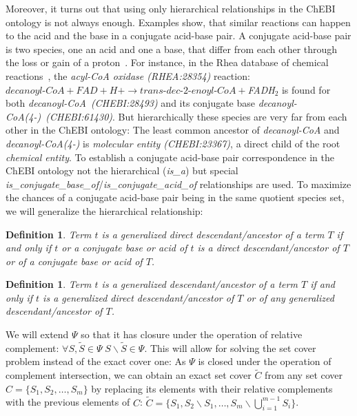 \documentclass[9pt]{article}
\newcounter{def}
\newcounter{rm}
\begin{document}
Moreover, it turns out that using only hierarchical relationships in the ChEBI ontology is not always enough. Examples show, that similar reactions can happen to the acid and the base in a conjugate acid-base pair. A conjugate acid-base pair is two species, one an acid and one a base, that differ from each other through the loss or gain of a proton~\citep{stoker2012general}. For instance, in the Rhea database of chemical reactions~\citep{Alcantara2012}, the \textit{acyl-CoA oxidase (RHEA:28354)} reaction: $\textit{decanoyl-CoA} + \textit{FAD} + \textit{H+} \rightarrow \textit{trans-dec-2-enoyl-CoA} + $\textit{FADH$_2$} is found for both \textit{decanoyl-CoA~(CHEBI:28493)} and its conjugate base \textit{decanoyl-CoA(4-)~(CHEBI:61430)}. But hierarchically these species are very far from each other in the ChEBI ontology: The least common ancestor of \textit{decanoyl-CoA} and \textit{decanoyl-CoA(4-)} is \textit{molecular entity (CHEBI:23367)}, a direct child of the root \textit{chemical entity}. To establish a conjugate acid-base pair correspondence in the ChEBI ontology not the hierarchical (\textit{is\_a}) but special \textit{is\_conjugate\_base\_of}/\textit{is\_conjugate\_acid\_of} relationships are used. To maximize the chances of a conjugate acid-base pair being in the same quotient species set, we will generalize the hierarchical relationship:

\newtheorem{dirgent}[def]{Definition}
\begin{dirgent}
Term $t$ is a \emph{generalized direct descendant/ancestor} of a term $T$ if and only if $t$ or a conjugate base or acid of $t$ is a direct descendant/ancestor of $T$ or of a conjugate base or acid of $T$.
\end{dirgent} 

\newtheorem{gent}[def]{Definition}
\begin{gent}
Term $t$ is a \emph{generalized descendant/ancestor} of a term $T$ if and only if $t$ is a generalized direct descendant/ancestor of $T$ or of any generalized descendant/ancestor of $T$.
\end{gent} 

We will extend $\Psi$ so that it has closure under the operation of relative complement: $\forall S,\tilde{S} \in \Psi \; S\backslash\tilde{S} \in \Psi$. This will allow for solving the set cover problem instead of the exact cover one:  As $\Psi$ is closed under the operation of complement intersection, we can obtain an exact set cover $\tilde{C}$ from any set cover $C = \{S_1, S_2, \ldots, S_m\}$ by replacing its elements with their relative complements with the previous elements of $C$: $\tilde{C} = \{S_1, S_2 \backslash S_1, \ldots, S_m \backslash \bigcup^{m - 1}_{i = 1}{S_i}\}$.
\end{document}
